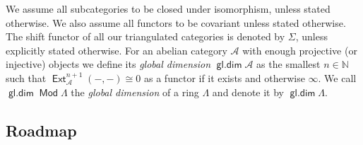 \documentclass[reqno, 12pt, a4paper, twosided, english]{amsart}
\theoremstyle{plain}
\theoremstyle{definition}
\theoremstyle{remark}
\newtheorem*{Key Statement}{Key Statement}
\DeclareMathOperator{\gldim}{\mathsf{gl.dim}}
\DeclareMathOperator{\Mod}{\mathsf{Mod}}
\DeclareMathOperator{\Ext}{\mathsf{Ext}}
\newcommand{\opname}[1]{\operatorname{\mathsf{#1}}}
\renewcommand{\Mod}{\opname{Mod}\nolimits}
\newcommand{\cA}{\mathcal{A}}
\begin{document}
We assume all subcategories to be closed under isomorphism, unless stated otherwise. We also assume all functors to be covariant unless stated otherwise.
The shift functor of all our triangulated categories is denoted by $\Sigma$, unless explicitly stated otherwise.
For an abelian category $\cA$ with enough projective (or injective) objects we define its \emph{global dimension} $\gldim \cA$ as the smallest $n \in \mathbb{N}$ such that $\Ext^{n+1}_{\cA}(-,-) \cong 0$ as a functor if it exists and otherwise $\infty$. We call $\gldim \Mod \Lambda$ the \emph{global dimension} of a ring $\Lambda$ and denote it by $\gldim \Lambda$.

\subsection{Roadmap}\label{subsec:roadmap}
\end{document}
